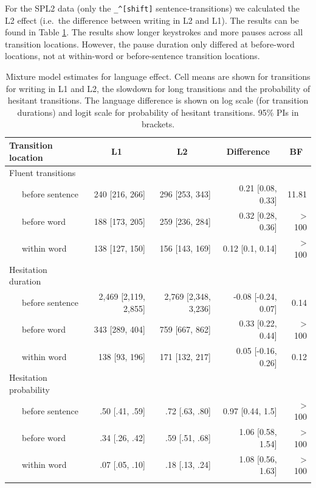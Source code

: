 \begin{appendix}
For the SPL2 data (only the \texttt{\_\^{}{[}shift{]}}
sentence-transitions) we calculated the L2 effect (i.e.~the difference
between writing in L2 and L1). The results can be found in Table
\ref{tab:l2effect}. The results show longer keystrokes and more pauses
across all transition locations. However, the pause duration only
differed at before-word locations, not at within-word or before-sentence
transition locations.

\begin{table}[tbp]

\begin{center}
\begin{threeparttable}

\caption{\label{tab:l2effect}Mixture model estimates for language effect. Cell means are shown for transitions for writing in L1 and L2, the slowdown for long transitions and the probability of hesitant transitions. The language difference is shown on log scale (for transition durations) and logit scale for probability of hesitant transitions. 95\% PIs in brackets.}

\small{

\begin{tabular}{lrrrr}
\toprule
Transition location & \multicolumn{1}{c}{L1} & \multicolumn{1}{c}{L2} & \multicolumn{1}{c}{Difference} & \multicolumn{1}{c}{BF}\\
\midrule
Fluent transitions &  &  &  & \\
\ \ \ before sentence & 240 [216, 266] & 296 [253, 343] & 0.21 [0.08, 0.33] & 11.81\\
\ \ \ before word & 188 [173, 205] & 259 [236, 284] & 0.32 [0.28, 0.36] & > 100\\
\ \ \ within word & 138 [127, 150] & 156 [143, 169] & 0.12 [0.1, 0.14] & > 100\\
Hesitation duration &  &  &  & \\
\ \ \ before sentence & 2,469 [2,119, 2,855] & 2,769 [2,348, 3,236] & -0.08 [-0.24, 0.07] & 0.14\\
\ \ \ before word & 343 [289, 404] & 759 [667, 862] & 0.33 [0.22, 0.44] & > 100\\
\ \ \ within word & 138 [93, 196] & 171 [132, 217] & 0.05 [-0.16, 0.26] & 0.12\\
Hesitation probability &  &  &  & \\
\ \ \ before sentence & .50 [.41, .59] & .72 [.63, .80] & 0.97 [0.44, 1.5] & > 100\\
\ \ \ before word & .34 [.26, .42] & .59 [.51, .68] & 1.06 [0.58, 1.54] & > 100\\
\ \ \ within word & .07 [.05, .10] & .18 [.13, .24] & 1.08 [0.56, 1.63] & > 100\\
\bottomrule
\addlinespace
\end{tabular}

}
\end{threeparttable}
\end{center}
\end{table}
\end{appendix}
